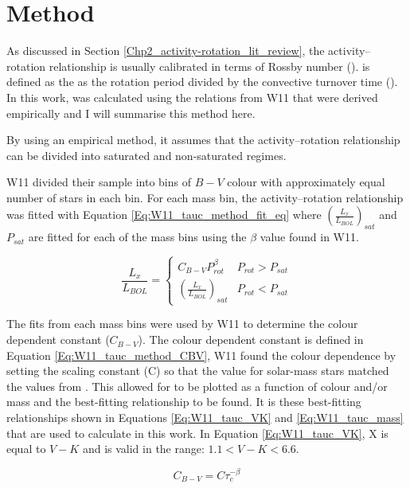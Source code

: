 \section{Method}

As discussed in Section \ref{Chp2_activity-rotation_lit_review}, the activity--rotation relationship is usually calibrated in terms of Rossby number (\Ro). \Ro is defined as the as the rotation period divided by the convective turnover time (\tauc). In this work, \tauc was calculated using the relations from W11 that were derived empirically and I will summarise this method here.

By using an empirical method, it assumes that the activity--rotation relationship can be divided into saturated and non-saturated regimes.

W11 divided their sample into bins of $B-V$ colour with approximately equal number of stars in each bin. For each mass bin, the activity--rotation relationship was fitted with Equation \ref{Eq:W11_tauc_method_fit_eq} where $(\frac{L_{x}}{L_{BOL}})_{sat}$ and $P_{sat}$ are fitted for each of the mass bins using the $\beta$ value found in W11.

\begin{equation}
    \frac{L_{x}}{L_{BOL}} = 
    \begin{cases}
        C_{B-V}P_{rot}^{\beta} & P_{rot} > P_{sat} \\
        (\frac{L_{x}}{L_{BOL}})_{sat} & P_{rot} < P_{sat}
    \end{cases}
    \label{Eq:W11_tauc_method_fit_eq}
\end{equation}

The fits from each mass bins were used by W11 to determine the colour dependent constant ($C_{B-V}$). The colour dependent constant is defined in Equation \ref{Eq:W11_tauc_method_CBV}, W11 found the colour dependence by setting the scaling constant (C) so that the \tauc value for solar-mass stars matched the values from \citet{Noyes_etal_1984}. This allowed for \tauc to be plotted as a function of colour and/or mass and the best-fitting relationship to be found. It is these best-fitting relationships shown in Equations \ref{Eq:W11_tauc_VK} and \ref{Eq:W11_tauc_mass} that are used to calculate \tauc in this work. In Equation \ref{Eq:W11_tauc_VK}, X is equal to $V-K$ and is valid in the range: $1.1 < V-K < 6.6$.

\begin{equation}
    C_{B-V} = C\tau_{c}^{-\beta}
    \label{Eq:W11_tauc_method_CBV}
\end{equation}

